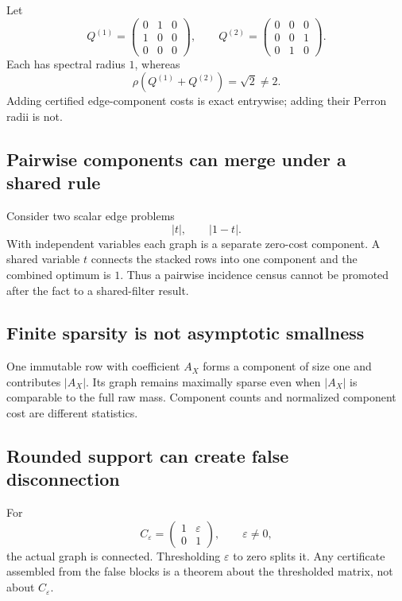 Let
\[
 Q^{(1)}
 =
 \begin{pmatrix}0&1&0\\1&0&0\\0&0&0\end{pmatrix},
 \qquad
 Q^{(2)}
 =
 \begin{pmatrix}0&0&0\\0&0&1\\0&1&0\end{pmatrix}.
\]
Each has spectral radius \(1\), whereas
\[
 \rho(Q^{(1)}+Q^{(2)})=\sqrt2\ne2.
\]
Adding certified edge-component costs is exact entrywise; adding their
Perron radii is not.

\subsection{Pairwise components can merge under a shared rule}

Consider two scalar edge problems
\[
 |t|,\qquad |1-t|.
\]
With independent variables each graph is a separate zero-cost
component. A shared variable \(t\) connects the stacked rows into one
component and the combined optimum is \(1\). Thus a pairwise incidence
census cannot be promoted after the fact to a shared-filter result.

\subsection{Finite sparsity is not asymptotic smallness}

One immutable row with coefficient \(A_X\) forms a component of size
one and contributes \(|A_X|\). Its graph remains maximally sparse even
when \(|A_X|\) is comparable to the full raw mass. Component counts and
normalized component cost are different statistics.

\subsection{Rounded support can create false disconnection}

For
\[
 C_\varepsilon=
 \begin{pmatrix}1&\varepsilon\\0&1\end{pmatrix},
 \qquad \varepsilon\ne0,
\]
the actual graph is connected. Thresholding \(\varepsilon\) to zero
splits it. Any certificate assembled from the false blocks is a theorem
about the thresholded matrix, not about \(C_\varepsilon\).
